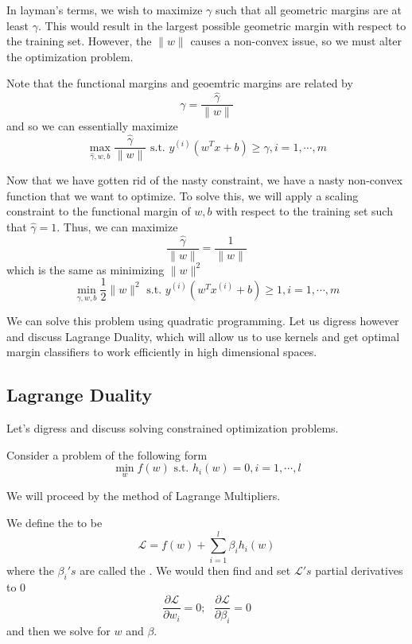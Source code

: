 \documentclass[12pt]{scrartcl}
\begin{document}
In layman's terms, we wish to maximize $\gamma$ such that all geometric margins are at least $\gamma$. This would result in the largest possible geometric margin with respect to the training set. However, the $\lVert w \rVert$ causes a non-convex issue, so we must alter the optimization problem. 

\begin{note}
    Note that the functional margins and geoemtric margins are related by 
    \[\gamma = \frac{\hat \gamma}{\lVert w \rVert}\] 
    and so we can essentially maximize
\[\underset{\hat \gamma, w, b}{\max } \frac{\hat \gamma}{\lVert w \rVert} \text{ s.t. } y^{(i)}(w^Tx + b) \geq \hat \gamma, i = 1, \cdots, m\]
\end{note}
Now that we have gotten rid of the nasty constraint, we have a nasty non-convex function that we want to optimize. To solve this, we will apply a scaling constraint to the functional margin of $w, b$ with respect to the training set such that 
$\hat \gamma = 1$. Thus, we can maximize 
\[\frac{\hat \gamma}{\lVert w \rVert} = \frac{1}{\lVert w \rVert}\] which is the same as minimizing $\lVert w \rVert ^2$
\[\underset{\gamma, w, b}{\min} \frac{1}{2}\lVert w \rVert^2 \text{ s.t. } y^{(i)} (w^Tx^{(i)} + b) \geq 1, i = 1, \cdots, m\]

We can solve this problem using quadratic programming. Let us digress however and discuss Lagrange Duality, which will allow us to use kernels and get optimal margin classifiers to work efficiently in high dimensional spaces.

\subsection{Lagrange Duality}

Let's digress and discuss solving constrained optimization problems.
\begin{example}
    Consider a problem of the following form
    \[\min_w f(w) \text{ s.t. } h_i(w) = 0, i = 1, \cdots, l\]

We will proceed by the method of Lagrange Multipliers.
\begin{definition}
    We define the  to be 
    \[\mathcal{L} = f(w) + \sum_{i=1}^l \beta_ih_i(w)\]
    where the $\beta_i's$ are called the . We would then find and set $\mathcal{L}'s$ partial derivatives to 0
    \[\frac{\partial \mathcal{L}}{\partial w_i  } = 0; \ \ \ \frac{\partial \mathcal{L}}{\partial \beta_i} = 0\]
    and then we solve for $w$ and $\beta$.
\end{definition}
\end{example}
\end{document}
